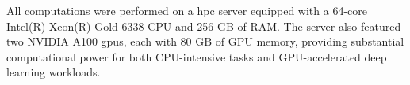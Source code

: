\documentclass[pdflatex, sn-mathphys-num, lineno]{sn-jnl}%
\theoremstyle{thmstyleone}%
\theoremstyle{thmstyletwo}%
\theoremstyle{thmstylethree}%
\begin{document}
All computations were performed on a \gls{hpc} server equipped with a 64-core Intel(R) Xeon(R) Gold 6338 CPU and 256 GB of RAM.
The server also featured two NVIDIA A100 \glspl{gpu}, each with 80 GB of GPU memory, providing substantial computational power for both CPU-intensive tasks and GPU-accelerated deep learning workloads.






\end{document}
